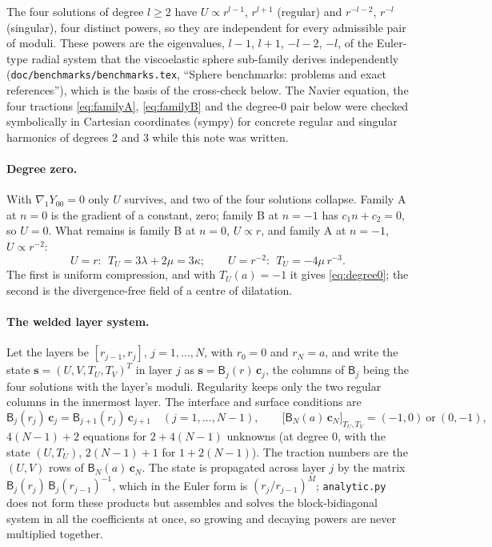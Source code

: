 \documentclass[11pt]{article}
\numberwithin{equation}{section}
\newcommand{\code}[1]{\texttt{#1}}
\newcommand{\gradone}{\nabla_{1}}
\begin{document}
The four solutions of degree $l\ge2$ have $U\propto r^{l-1}$, $r^{l+1}$
(regular) and $r^{-l-2}$, $r^{-l}$ (singular), four distinct powers, so they
are independent for every admissible pair of moduli. These powers are the
eigenvalues, $l-1$, $l+1$, $-l-2$, $-l$, of the Euler-type radial system
that the viscoelastic sphere sub-family derives independently
(\code{doc/benchmarks/benchmarks.tex}, ``Sphere benchmarks: problems and exact
references''), which is the basis of the cross-check below. The Navier
equation, the four tractions \eqref{eq:familyA}, \eqref{eq:familyB} and the
degree-0 pair below were checked symbolically in Cartesian coordinates
(sympy) for concrete regular and singular harmonics of degrees 2 and 3
while this note was written.

\paragraph{Degree zero.} With $\gradone Y_{00}=0$ only $U$ survives, and
two of the four solutions collapse. Family A at $n=0$ is the gradient of a
constant, zero; family B at $n=-1$ has $c_1n+c_2=0$, so $U=0$. What remains
is family B at $n=0$, $U\propto r$, and family A at $n=-1$, $U\propto
r^{-2}$:
\begin{equation}
  U = r:\ \ T_U = 3\lambda+2\mu = 3\kappa;
  \qquad
  U = r^{-2}:\ \ T_U = -4\mu\,r^{-3}.
\end{equation}
The first is uniform compression, and with $T_U(a)=-1$ it gives
\eqref{eq:degree0}; the second is the divergence-free field of a
centre of dilatation.

\paragraph{The welded layer system.} Let the layers be $[r_{j-1},r_j]$,
$j=1,\dots,N$, with $r_0=0$ and $r_N=a$, and write the state
$\mathbf s=(U,V,T_U,T_V)^T$ in layer $j$ as $\mathbf s=\mathsf B_j(r)\,
\mathbf c_j$, the columns of $\mathsf B_j$ being the four solutions with
the layer's moduli. Regularity keeps only the two regular columns in the
innermost layer. The interface and surface conditions are
\begin{equation}
  \mathsf B_j(r_j)\,\mathbf c_j = \mathsf B_{j+1}(r_j)\,\mathbf c_{j+1}
  \quad (j=1,\dots,N-1),
  \qquad
  \bigl[\mathsf B_N(a)\,\mathbf c_N\bigr]_{T_U,T_V} = (-1,0)\ \text{or}\ (0,-1),
\end{equation}
$4(N-1)+2$ equations for $2+4(N-1)$ unknowns (at degree 0, with the state
$(U,T_U)$, $2(N-1)+1$ for $1+2(N-1)$). The traction numbers are the
$(U,V)$ rows of $\mathsf B_N(a)\,\mathbf c_N$. The state is propagated
across layer $j$ by the matrix $\mathsf B_j(r_j)\,\mathsf B_j(r_{j-1})^{-1}$,
which in the Euler form is $(r_j/r_{j-1})^{M}$; \code{analytic.py} does not
form these products but assembles and solves the block-bidiagonal system in
all the coefficients at once, so growing and decaying powers are never
multiplied together.
\end{document}
